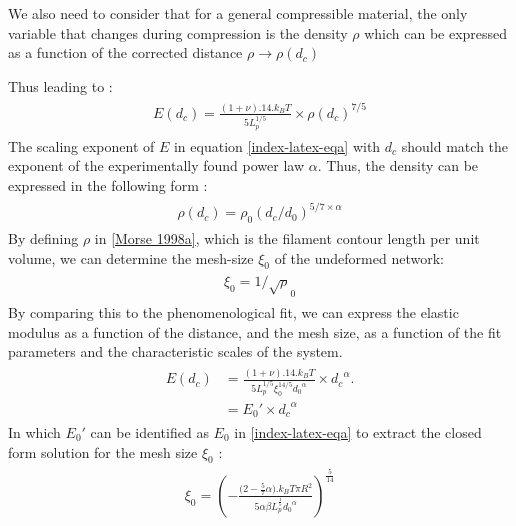 \documentclass[A4paperpaper,11pt,english]{sphinxmanual}
\begin{document}
We also need to consider that for a general compressible material, the
only variable that changes during compression is the density \(\rho\)
which can be expressed as a function of the corrected distance \(\rho \to
\rho(d_c)\)

Thus leading to :
\label{index-latex:equation-eqa}\begin{gather}
\begin{split}E(d_c)=\frac{ (1+\nu).14.k_BT}{5L_p^{1/5}}\times \rho(d_c)^{7/5}\end{split}\label{index-latex-eqa}
\end{gather}
The scaling exponent of \(E\) in equation \eqref{index-latex-eqa} with \(d_c\) should match the exponent
of the experimentally found power law \(\alpha\). Thus, the density can be
expressed in the following form :
\label{index-latex:equation-eq-rho}\begin{gather}
\begin{split}\rho(d_c)=\rho_0(d_c/d_0)^{5/7\times\alpha}\end{split}\label{index-latex-eq-rho}
\end{gather}
By defining \(\rho\) in {\hyperref[index-latex:morse1998a]{{[}Morse  1998a{]}}}, which is
the filament contour length per unit volume, we can determine the
mesh-size \(\xi_0\) of the undeformed network:
\label{index-latex:equation-eqa38}\begin{gather}
\begin{split}\xi_0 = 1/\sqrt\rho_0\end{split}\label{index-latex-eqa38}
\end{gather}
By comparing this to the phenomenological fit, we can express the elastic
modulus as a function of the distance, and the mesh size, as a function of the
fit parameters and the characteristic scales of the system.
\label{index-latex:equation-eqb}\begin{gather}
\begin{split}E(d_c)     &=  \frac{(1+\nu).14.k_BT}{5L_p^{1/5}\xi_0^{14/5} \left.d_0\right.^{\alpha}}\times \left.d_c\right.^{\alpha}.\\
                &=  E_0' \times \left.d_c\right.^{\alpha}\end{split}\label{index-latex-eqb}
\end{gather}
In which \(E_0'\) can be identified as \(E_0\) in \eqref{index-latex-eqa} to extract the
closed form solution for the mesh size \(\xi_0\) :
\label{index-latex:equation-eqa39}\begin{gather}
\begin{split}\xi_0=\left(-\frac{({2-\frac{5}{7}\alpha)}.k_BT\pi R^2}{5\alpha \beta L_p^{\frac{1}{5}}\left.d_0\right.^{\alpha}}\right)^{\frac{5}{14}}\end{split}\label{index-latex-eqa39}
\end{gather}
\end{document}

